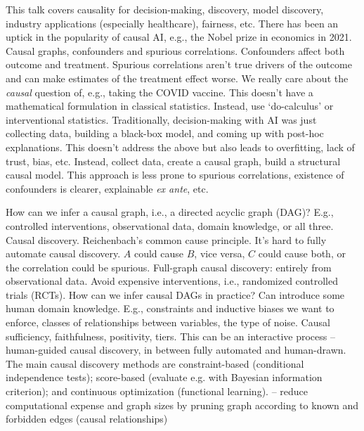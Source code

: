 
\begin{affils}
\end{affils}

This talk covers causality for decision-making, discovery, model discovery, industry
applications (especially healthcare), fairness, etc. There has been an uptick in the
popularity of causal AI, e.g., the Nobel prize in economics in 2021.
Causal graphs, confounders and spurious correlations.
Confounders affect both outcome and treatment.
Spurious correlations aren't true drivers of the outcome and can make estimates of the
treatment effect worse.
We really care about the \emph{causal} question of, e.g., taking the COVID vaccine.
This doesn't have a mathematical formulation in classical statistics.
Instead, use `do-calculus' or interventional statistics.
Traditionally, decision-making with AI was just collecting data, building a black-box
model, and coming up with post-hoc explanations.
This doesn't address the above but also leads to overfitting, lack of trust, bias, etc.
Instead, collect data, create a causal graph, build a structural causal model.
This approach is less prone to spurious correlations, existence of confounders is
clearer, explainable \emph{ex ante}, etc.

How can we infer a causal
graph, i.e., a directed acyclic graph (DAG)?
E.g., controlled interventions, observational data, domain knowledge, or all three.
Causal discovery.
Reichenbach's common cause principle.
It's hard to fully automate causal discovery.
$A$ could cause $B$, vice versa, $C$ could cause both, or the correlation could be spurious.
Full-graph causal discovery: entirely from observational data.
Avoid expensive interventions, i.e., randomized controlled trials (RCTs).
How can we infer causal DAGs in practice?
Can introduce some human domain knowledge.
E.g., constraints and inductive biases we want to enforce, classes of relationships
between variables, the type of noise.
Causal sufficiency, faithfulness, positivity, tiers.
This can be an interactive process -- human-guided causal discovery, in between fully
automated and human-drawn.
The main causal discovery methods are constraint-based (conditional independence
tests); score-based (evaluate e.g. with Bayesian information criterion); and continuous
optimization (functional learning).
\textcites{Kleinegesse2022} -- reduce computational expense and graph sizes by pruning
graph according to known and forbidden edges (causal relationships)

